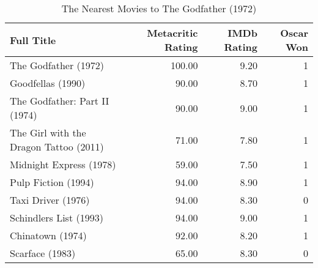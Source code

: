\begin{table}[H]
\centering
\begin{tabular}{lrrr}
  \hline
Full Title & Metacritic Rating & IMDb Rating & Oscar Won \\ 
  \hline
The Godfather (1972) & 100.00 & 9.20 &   1 \\ 
  Goodfellas (1990) & 90.00 & 8.70 &   1 \\ 
  The Godfather: Part II (1974) & 90.00 & 9.00 &   1 \\ 
  The Girl with the Dragon Tattoo (2011) & 71.00 & 7.80 &   1 \\ 
  Midnight Express (1978) & 59.00 & 7.50 &   1 \\ 
  Pulp Fiction (1994) & 94.00 & 8.90 &   1 \\ 
  Taxi Driver (1976) & 94.00 & 8.30 &   0 \\ 
  Schindlers List (1993) & 94.00 & 9.00 &   1 \\ 
  Chinatown (1974) & 92.00 & 8.20 &   1 \\ 
  Scarface (1983) & 65.00 & 8.30 &   0 \\ 
   \hline
\end{tabular}
\caption{The Nearest Movies to The Godfather (1972)} 
\end{table}

